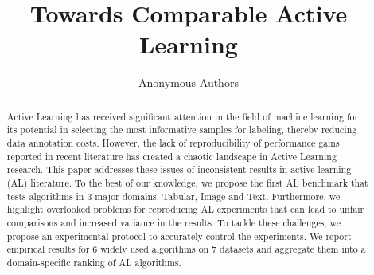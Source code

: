 \documentclass[]{article}
\title{Towards Comparable Active Learning}
\author{%
	Anonymous Authors
}
\begin{document}
\maketitle

\begin{abstract}
	Active Learning has received significant attention in the field of machine learning for its potential in selecting the most informative samples for labeling, thereby reducing data annotation costs. However, the lack of reproducibility of performance gains reported in recent literature has created a chaotic landscape in Active Learning research. 
	This paper addresses these issues of inconsistent results in active learning (AL) literature.
	To the best of our knowledge, we propose the first AL benchmark that tests algorithms in 3 major domains: Tabular, Image and Text.
	Furthermore, we highlight overlooked problems for reproducing AL experiments that can lead to unfair comparisons and increased variance in the results.
	To tackle these challenges, we propose an experimental protocol to accurately control the experiments.
	We report empirical results for 6 widely used algorithms on 7 datasets and aggregate them into a domain-specific ranking of AL algorithms.
\end{abstract}
\end{document}
